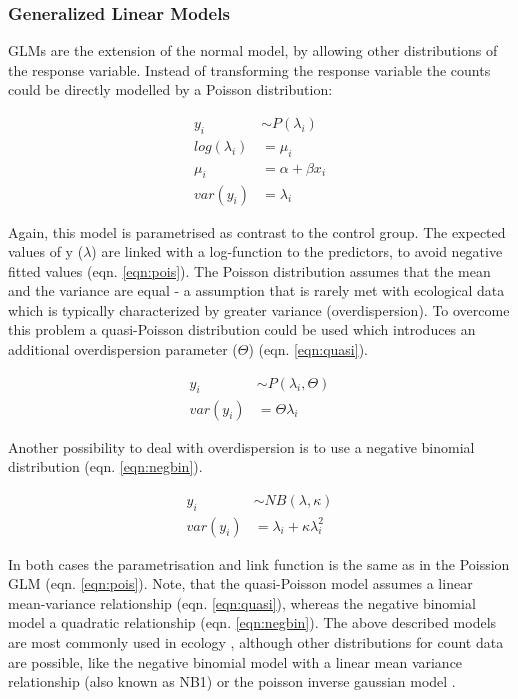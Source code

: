 \documentclass{scrartcl}
\begin{document}
\subsubsection{Generalized Linear Models}
GLMs are the extension of the normal model, by allowing other distributions of the response variable.
Instead of transforming the response variable the counts could be directly modelled by a Poisson distribution:

\begin{align}
  y_i &\sim P(\lambda_i) \nonumber \\
  log(\lambda_i) &= \mu_i \label{eqn:pois} \\
  \mu_i &= \alpha + \beta x_i \nonumber \\
  var(y_i) &= \lambda_i \nonumber
\end{align}

Again, this model is parametrised as contrast to the control group. 
The expected values of y ($\lambda$) are linked with a log-function to the predictors, to avoid negative fitted values (eqn. \ref{eqn:pois}). 
The Poisson distribution assumes that the mean and the variance are equal - a assumption that is rarely met with ecological data which is typically characterized by greater variance (overdispersion).
To overcome this problem a quasi-Poisson distribution could be used which introduces an additional overdispersion parameter ($\Theta$) (eqn. \ref{eqn:quasi}).

\begin{align}
  y_i &\sim P(\lambda_i, \Theta) \label{eqn:quasi} \\
  var(y_i) &= \Theta \lambda_i  \nonumber
\end{align}

Another possibility to deal with overdispersion is to use a negative binomial distribution (eqn. \ref{eqn:negbin}).

\begin{align}
  y_i &\sim NB(\lambda, \kappa) \label{eqn:negbin}  \\
  var(y_i) &= \lambda_i + \kappa \lambda_i^2 \nonumber
\end{align}

In both cases the parametrisation and link function is the same as in the Poission GLM (eqn. \ref{eqn:pois}).
Note, that the quasi-Poisson model assumes a linear mean-variance relationship (eqn. \ref{eqn:quasi}), whereas the negative binomial model a quadratic relationship (eqn. \ref{eqn:negbin}).
The above described models are most commonly used in ecology \citep{ver_hoef_quasi-poisson_2007}, although other distributions for count data are possible, like the negative binomial model with a linear mean variance relationship (also known as NB1) or the poisson inverse gaussian model \citep{hilbe_modeling_2014}.
\end{document}
